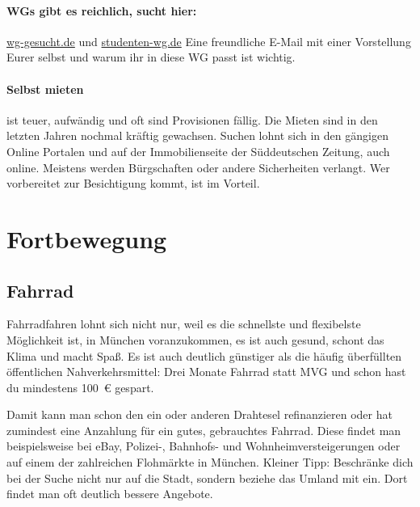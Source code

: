 \documentclass[twoside,12pt,parskip=half-]{scrartcl}
\begin{document}
\paragraph{WGs gibt es reichlich, sucht hier:}
\url{wg-gesucht.de} und \url{studenten-wg.de}\newline
Eine freundliche E-Mail mit einer Vorstellung Eurer selbst und warum ihr
in diese WG passt ist wichtig.

\paragraph{Selbst mieten} ist teuer, aufwändig und oft sind Provisionen
fällig. Die Mieten sind in den letzten Jahren nochmal kräftig gewachsen.
Suchen
lohnt sich in den gängigen Online Portalen und auf der Immobilienseite der
Süddeutschen Zeitung, auch online. Meistens werden Bürgschaften oder andere
Sicherheiten verlangt.  Wer vorbereitet zur Besichtigung kommt, ist im Vorteil.

\clearpage

\section{Fortbewegung}

\subsection{Fahrrad}

Fahrradfahren lohnt sich nicht nur, weil es die schnellste und
flexibelste Möglichkeit ist, in München voranzukommen, es ist auch
gesund, schont das Klima und macht Spaß.  Es ist auch deutlich
günstiger als die häufig überfüllten öffentlichen Nahverkehrsmittel:
Drei Monate Fahrrad statt MVG und schon hast du mindestens 100~€
gespart.

Damit kann man schon den ein oder anderen Drahtesel refinanzieren oder
hat zumindest eine Anzahlung für ein gutes, gebrauchtes Fahrrad. Diese
findet man beispielsweise bei eBay, Polizei-, Bahnhofs- und
Wohnheimversteigerungen oder auf einem der zahlreichen Flohmärkte in
München. Kleiner Tipp: Beschränke dich bei der Suche nicht nur auf die
Stadt, sondern beziehe das Umland mit ein. Dort findet man oft
deutlich bessere Angebote.
\end{document}
